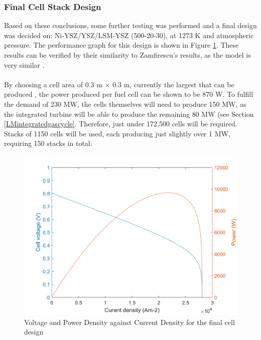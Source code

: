   
    \subsubsection{Final Cell Stack Design}
    
    Based on these conclusions, some further testing was performed and a final design was decided on:
Ni-YSZ/YSZ/LSM-YSZ (500-20-30), at 1273 K and atmospheric pressure. The performance graph for this design is shown in Figure \ref{LMfig:SOFCfinal}. These results can be verified by their similarity to Zamfirescu's results, as the model is very similar \cite{LM5}. 
\hspace{1cm}\\
\hspace{1cm}\\
By choosing a cell area of 0.3 m $\times$ 0.3 m, currently the largest that can be produced \cite{LM10}, the power produced per fuel cell can be shown to be 870 W. To fulfill the demand of 230 MW, the cells themselves will need to produce 150 MW, as the integrated turbine will be able to produce the remaining 80 MW (see Section \ref{LMintegratedgascycle}. Therefore, just under 172,500 cells will be required. Stacks of 1150 cells will be used, each producing just slightly over 1 MW, requiring 150 stacks in total.
\\

\begin{figure}[h]
    \centering
    \includegraphics[scale = 0.3]{power_voltage_against_current.png}
    \caption{Voltage and Power Density against Current Density for the final cell design}
    \label{LMfig:SOFCfinal}
\end{figure}


